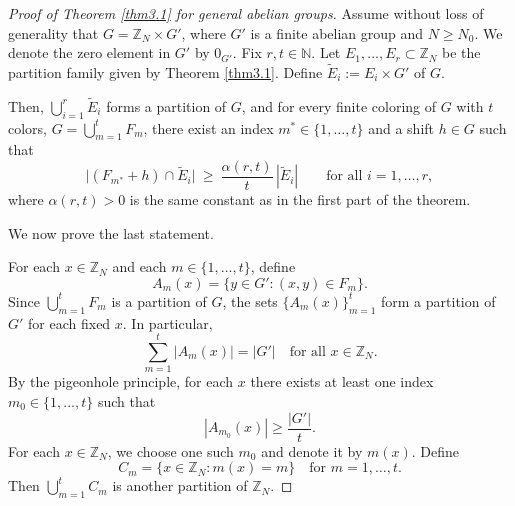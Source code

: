 \documentclass[11pt]{article}
\theoremstyle{definition}
\begin{document}
\begin{proof}[Proof of Theorem \ref{thm3.1} for general abelian groups]
Assume without loss of generality that $G=\mathbb{Z}_{N}\times G'$, where $G'$ is a finite abelian group and $N\ge N_0$. We denote the zero element in $G'$ by $0_{G'}$.
Fix $r,t\in\mathbb{N}$. Let $E_1,\dots,E_r\subset\mathbb{Z}_{N}$ be the partition family given by Theorem \ref{thm3.1}.
Define $\widetilde{E}_i := E_i\times G'$ of $G$.


Then, $\bigcup_{i=1}^r \widetilde{E}_i$ forms a partition of $G$, and for every finite coloring of $G$ with $t$ colors, $G=\bigcup_{m=1}^t F_m$, there exist an index $m^\ast\in\{1,\dots,t\}$
and a shift $h\in G$ such that
\[
\big|(F_{m^\ast}+h)\cap \widetilde{E}_i\big| \ \ge\ \frac{\alpha(r,t)}{t}\,|\widetilde{E}_i|
\qquad\text{for all }i=1,\dots,r,
\]
where $\alpha(r,t)>0$ is the same constant as in the first part of the theorem.


We now prove the last statement.

For each $x \in \mathbb{Z}_{N}$ and each $m \in \{1,\dots,t\}$, define 
\[
A_m(x) = \{y \in G' : (x,y) \in F_m\}.
\]
Since $\bigcup_{m=1}^t F_m$ is a partition of $G$, the sets $\{A_m(x)\}_{m=1}^t$ form a partition of $G'$ for each fixed $x$. In particular,
\[
\sum_{m=1}^t |A_m(x)| = |G'| \quad \text{for all } x \in \mathbb{Z}_{N}.
\]
By the pigeonhole principle, for each $x$ there exists at least one index $m_0 \in \{1,\dots,t\}$ such that
\[
|A_{m_0}(x)| \geq \frac{|G'|}{t}.
\]
For each $x \in \mathbb{Z}_{N}$, we choose one such $m_0$ and denote it by $m(x)$. Define
\[
C_m = \{x \in \mathbb{Z}_{N} : m(x) = m\} \quad \text{for } m = 1,\dots,t.
\]
Then $\bigcup_{m=1}^t C_m$ is another partition of $\mathbb{Z}_N$.


\end{proof}
\end{document}
